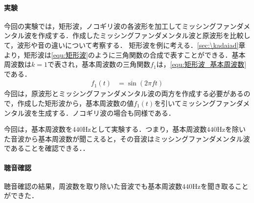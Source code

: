 \paragraph{実験}
今回の実験では，矩形波，ノコギリ波の各波形を加工してミッシングファンダメンタル波を作成する．作成したミッシングファンダメンタル波と原波形を比較して，波形や音の違いについて考察する．
\method
矩形波を例に考える．\ref{sec:\kadaiad}章より，矩形波は\eqref{equ:矩形波}のように三角関数の合成で表すことができる．基本周波数は\(k=1\)で表され，基本周波数の三角関数\(f_1\)は，\eqref{equ:矩形波_基本周波数}である．
\begin{align}
    f_1(t) & =\sin(2\pi ft)\label{equ:矩形波_基本周波数}
\end{align}
今回は，原波形とミッシングファンダメンタル波の両方を作成する必要があるので，作成した矩形波から，基本周波数の値\(f_1(t)\)を引いてミッシングファンダメンタル波を生成する．ノコギリ波の場合も同様である．\par
今回は，基本周波数を\(440\textrm{Hz}\)として実験する．つまり，基本周波数\(440\textrm{Hz}\)を除いた音波から基本周波数が聞こえると，その音波はミッシングファンダメンタル波であることを確認できる．\scall{}．
\result
\paragraph{聴音確認}聴音確認の結果，周波数を取り除いた音波でも基本周波数\(440\textrm{Hz}\)を聞き取ることができた．
